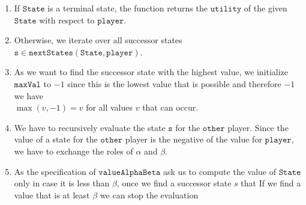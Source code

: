 \begin{enumerate}
\item If $\mathtt{State}$ is a terminal state, the function returns the $\mathtt{utility}$ of the given
      $\mathtt{State}$ with respect to $\mathtt{player}$.
\item Otherwise, we iterate over all successor states $\mathtt{s} \in \mathtt{nextStates}(\mathtt{State},
  \mathtt{player})$.
\item As we want to find the successor state with the highest value, we initialize $\mathtt{maxVal}$ to $-1$
      since this is the lowest value that is possible and therefore $-1$ we have
      \\[0.2cm]
      \hspace*{1.3cm}
      $\max(v, -1) = v$ \quad for all values $v$ that can occur.
\item We have to recursively evaluate the state $\mathtt{s}$ for the $\mathtt{other}$ player.
      Since the value of a state for the $\mathtt{other}$ player is the negative of the value for
      $\mathtt{player}$, we have to exchange the roles of $\alpha$ and $\beta$.
\item As the specification of $\mathtt{valueAlphaBeta}$ ask us to compute the value of $\mathtt{State}$ only in
      case it is less than $\beta$, once we find a successor state $s$ that 
      If we find a value that is at least $\beta$ we can stop the evaluation

\end{enumerate}



